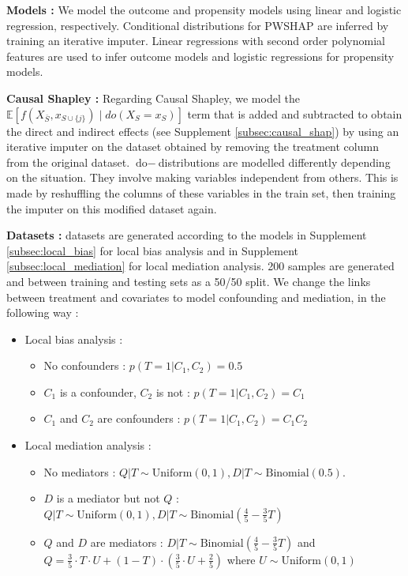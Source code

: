 \textbf{Models :} We model the outcome and propensity models using linear and logistic regression, respectively. Conditional distributions for PWSHAP are inferred by training an iterative imputer. Linear regressions with second order polynomial features are used to infer outcome models and logistic regressions for propensity models.

\textbf{Causal Shapley :} Regarding Causal Shapley, we model the $ \mathbb{E}\left[f\left(X_{\bar{S}}, x_{S \cup \{j\}}\right) \mid d o\left(X_{S}=x_{S}\right)\right]$ term that is added and subtracted to obtain the direct and indirect effects (see Supplement \ref{subsec:causal_shap}) by using an iterative imputer on the dataset obtained by removing the treatment column from the original dataset. $\text{do}-$distributions are modelled differently depending on the situation. They involve making variables independent from others. This is made by reshuffling the columns of these variables in the train set, then training the imputer on this modified dataset again.

\textbf{Datasets :} datasets are generated according to the models in Supplement \ref{subsec:local_bias} for local bias analysis and in Supplement \ref{subsec:local_mediation} for local mediation analysis. 200 samples are generated and between training and testing sets as a 50/50 split. We change the links between treatment and covariates to model confounding and mediation, in the following way :
\begin{itemize}
    \item Local bias analysis :
    \begin{itemize}
        \item No confounders : $p(T=1|C_1,C_2) = 0.5$
        \item $C_1$ is a confounder, $C_2$ is not : $p(T=1|C_1,C_2) = C_1$
        \item $C_1$ and $C_2$ are confounders : $p(T=1|C_1,C_2) = C_1C_2$
    \end{itemize}
    \item Local mediation analysis :
    \begin{itemize}
        \item No mediators : $Q|T \sim \text{Uniform}(0,1), D|T \sim \text{Binomial}(0.5)$.
        \item $D$ is a mediator but not $Q$ : $Q|T \sim \text{Uniform}(0,1), D|T \sim \text{Binomial}(\frac{4}{5} - \frac{3}{5}T)$
        \item $Q$ and $D$ are mediators : $D|T \sim \text{Binomial}(\frac{4}{5} - \frac{3}{5}T)$ and $Q = \frac{3}{5} \cdot T \cdot U + (1-T) \cdot (\frac{3}{5} \cdot U + \frac{2}{5})$ where $U \sim \text{Uniform}(0,1)$
    \end{itemize}
\end{itemize}

